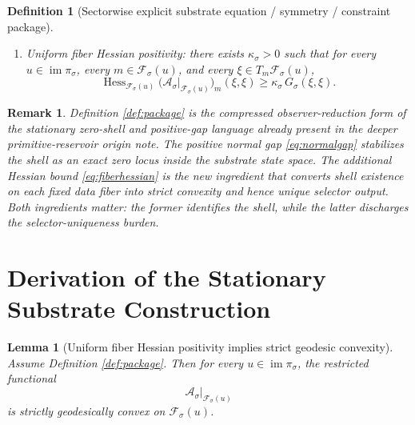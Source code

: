\documentclass[11pt]{article}
\newcommand{\SubSpace}[1]{\mathcal M_{#1}}
\newcommand{\SubMetric}[1]{G_{#1}}
\newcommand{\DataProj}[1]{\pi_{#1}}
\newcommand{\ShellEquation}[1]{\Phi_{#1}}
\newcommand{\Fiber}[1]{\mathcal F_{#1}}
\newcommand{\StationaryFunctional}[1]{\mathscr A_{#1}}
\newtheorem{definition}{Definition}
\newtheorem{lemma}{Lemma}
\newtheorem{remark}{Remark}
\begin{document}
\begin{definition}[Sectorwise explicit substrate equation / symmetry / constraint package]
\begin{enumerate}
\begin{enumerate}
        \[
        \DataProj{\sigma}(m)=u,
        \qquad
        \ShellEquation{\sigma}(m)=0
        \]
        admit at least one solution \(m\in\SubSpace{\sigma}\).
    \end{enumerate}
    \item Uniform fiber Hessian positivity: there exists \(\kappa_{\sigma}>0\) such that for every \(u\in\operatorname{im}\DataProj{\sigma}\), every \(m\in\Fiber{\sigma}(u)\), and every \(\xi\in T_m\Fiber{\sigma}(u)\),
    \begin{equation}
    \operatorname{Hess}_{\Fiber{\sigma}(u)}
    \bigl(\StationaryFunctional{\sigma}\big|_{\Fiber{\sigma}(u)}\bigr)_m(\xi,\xi)
    \ge
    \kappa_{\sigma}\,
    \SubMetric{\sigma}(\xi,\xi).
    \label{eq:fiberhessian}
    \end{equation}
\end{enumerate}
\end{definition}

\begin{remark}
Definition \ref{def:package} is the compressed observer-reduction form of the stationary zero-shell and positive-gap language already present in the deeper primitive-reservoir origin note. The positive normal gap \eqref{eq:normalgap} stabilizes the shell as an exact zero locus inside the substrate state space. The additional Hessian bound \eqref{eq:fiberhessian} is the new ingredient that converts shell existence on each fixed data fiber into strict convexity and hence unique selector output. Both ingredients matter: the former identifies the shell, while the latter discharges the selector-uniqueness burden.
\end{remark}

\section{Derivation of the Stationary Substrate Construction}

\begin{lemma}[Uniform fiber Hessian positivity implies strict geodesic convexity]
\label{lem:strictconvex}
Assume Definition \ref{def:package}. Then for every \(u\in\operatorname{im}\DataProj{\sigma}\), the restricted functional
\[
\StationaryFunctional{\sigma}\big|_{\Fiber{\sigma}(u)}
\]
is strictly geodesically convex on \(\Fiber{\sigma}(u)\).
\end{lemma}
\end{document}

